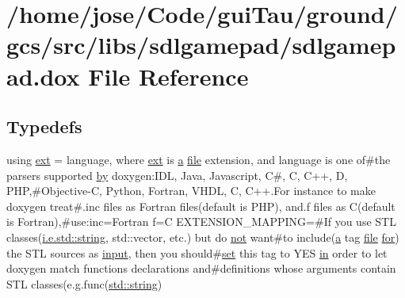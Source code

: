 \hypertarget{sdlgamepad_8dox}{\section{/home/jose/\-Code/gui\-Tau/ground/gcs/src/libs/sdlgamepad/sdlgamepad.dox File Reference}
\label{sdlgamepad_8dox}
}
\subsection*{Typedefs}
\begin{DoxyCompactItemize}
\item 
using \hyperlink{sdlgamepad_8dox_a6a79297c84f6ac85847cdc8c89676bff}{ext} = language, where \hyperlink{sdlgamepad_8dox_a6a79297c84f6ac85847cdc8c89676bff}{ext} is \hyperlink{glext_8h_ac8729153468b5dcf13f971b21d84d4e5}{a} \hyperlink{uavobjecttemplate_8m_a97c04efa65bcf0928abf9260bc5cbf46}{file} extension, and language is one of\#the parsers supported \hyperlink{glext_8h_aee54e9aab2837a54be2ff5fb1c073bd2}{by} doxygen\-:\-I\-D\-L, Java, Javascript, C\#, C, C++, D, P\-H\-P,\#Objective-\/C, Python, Fortran, V\-H\-D\-L, C, C++.For instance to make doxygen treat\#.inc files as Fortran files(default is P\-H\-P), and.\-f files as C(default is Fortran),\#use\-:inc=Fortran f=C E\-X\-T\-E\-N\-S\-I\-O\-N\-\_\-\-M\-A\-P\-P\-I\-N\-G=\#If you use S\-T\-L classes(\hyperlink{glext_8h_aa81bcd27b2208041814b4beacb88c2d9}{i.\-e.\-std\-::string}, std\-::vector, etc.) but do \hyperlink{uavobjecttemplate_8m_acf8758da9d0019183b0d213755711ee7}{not} want\#to include(\hyperlink{glext_8h_ac8729153468b5dcf13f971b21d84d4e5}{a} tag \hyperlink{uavobjecttemplate_8m_a97c04efa65bcf0928abf9260bc5cbf46}{file} \hyperlink{crypt_8h_a6f9c0aaf91aa1ee6f13a43244e90af87}{for}) the S\-T\-L sources as \hyperlink{glext_8h_ad3c78daa7d8673f71649d4840c641779}{input}, then you should\#\hyperlink{analyze_raw_8m_a11671e12e7b3fc5881313758d6cc0b45}{set} this tag to Y\-E\-S \hyperlink{glext_8h_a83ad0ee7f1e06b59c90271716e689080}{in} order to let doxygen match functions declarations and\#definitions whose arguments contain S\-T\-L classes(e.\-g.\-func(\hyperlink{glext_8h_aa81bcd27b2208041814b4beacb88c2d9}{std\-::string})
\end{DoxyCompactItemize}
